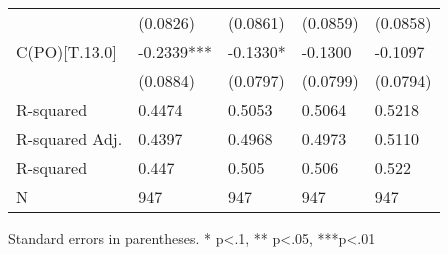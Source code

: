 \begin{table}
\begin{center}
\begin{tabular}{lllll}
                         & (0.0826)   & (0.0861)   & (0.0859)   & (0.0858)    \\
C(PO)[T.13.0]            & -0.2339*** & -0.1330*   & -0.1300    & -0.1097     \\
                         & (0.0884)   & (0.0797)   & (0.0799)   & (0.0794)    \\
R-squared                & 0.4474     & 0.5053     & 0.5064     & 0.5218      \\
R-squared Adj.           & 0.4397     & 0.4968     & 0.4973     & 0.5110      \\
R-squared                & 0.447      & 0.505      & 0.506      & 0.522       \\
N                        & 947        & 947        & 947        & 947         \\
\hline
\end{tabular}
\end{center}
\end{table}
\bigskip
Standard errors in parentheses. \newline 
* p<.1, ** p<.05, ***p<.01